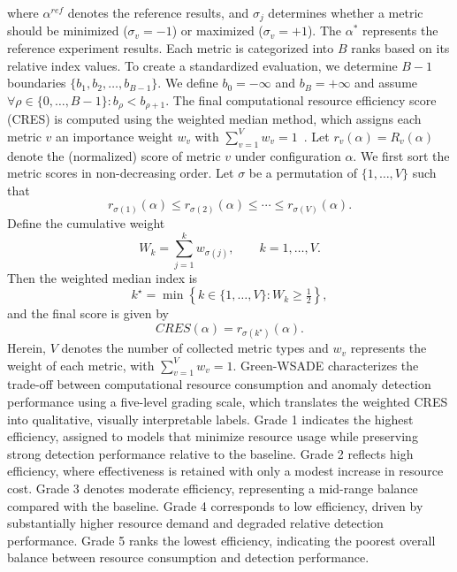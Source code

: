 \documentclass[pdflatex,sn-mathphys-num]{sn-jnl}%
\theoremstyle{thmstyleone}
\theoremstyle{thmstyletwo}%
\theoremstyle{thmstylethree}%
\begin{document}
where $\alpha^{ref}$ denotes the reference results, and $\sigma_j$ determines whether a metric should be minimized ($\sigma_v=-1$) or maximized ($\sigma_v=+1$). The $\alpha^*$ represents the reference experiment results. Each metric is categorized into $B$ ranks based on its relative index values.
To create a standardized evaluation, we determine $B-1$ boundaries $\{b_1, b_2, \ldots, b_{B-1} \}$.
We define $b_0 = -\infty$ and $b_B = +\infty$ and assume $\forall \rho \in \{ 0,\ldots,B-1\} : b_{\rho}<b_{\rho+1}$.
The final computational resource efficiency score (CRES) is computed using the weighted median method, which assigns each metric $v$ an importance weight $w_v$ with $\sum_{v=1}^{V} w_v = 1$~\cite{efficiency_framework}. Let $r_v(\alpha)=R_v(\alpha)$ denote the (normalized) score of metric $v$ under configuration $\alpha$. We first sort the metric scores in non-decreasing order.
Let $\sigma$ be a permutation of $\{1,\ldots,V\}$ such that
\begin{equation}
r_{\sigma(1)}(\alpha)\le r_{\sigma(2)}(\alpha)\le \cdots \le r_{\sigma(V)}(\alpha).
\end{equation}
Define the cumulative weight
\begin{equation}
W_k=\sum_{j=1}^{k} w_{\sigma(j)}, \qquad k=1,\ldots,V.
\end{equation}
Then the weighted median index is
\begin{equation}
k^{\star}=\min\left\{k\in\{1,\ldots,V\}: W_k\ge \tfrac{1}{2}\right\},
\end{equation}
and the final score is given by
\begin{equation}
CRES(\alpha)=r_{\sigma(k^{\star})}(\alpha).
\label{eq:cres_wmed}
\end{equation}
Herein, $V$ denotes the number of collected metric types and $w_v$ represents the weight of each metric, with $\sum_{v=1}^{V} w_v = 1$.
Green-WSADE characterizes the trade-off between computational resource consumption and anomaly detection performance using a five-level grading scale, which translates the weighted CRES into qualitative, visually interpretable labels. Grade 1 indicates the highest efficiency, assigned to models that minimize resource usage while preserving strong detection performance relative to the baseline. Grade 2 reflects high efficiency, where effectiveness is retained with only a modest increase in resource cost. Grade 3 denotes moderate efficiency, representing a mid-range balance compared with the baseline. Grade 4 corresponds to low efficiency, driven by substantially higher resource demand and degraded relative detection performance. Grade 5 ranks the lowest efficiency, indicating the poorest overall balance between resource consumption and detection performance.
\end{document}

